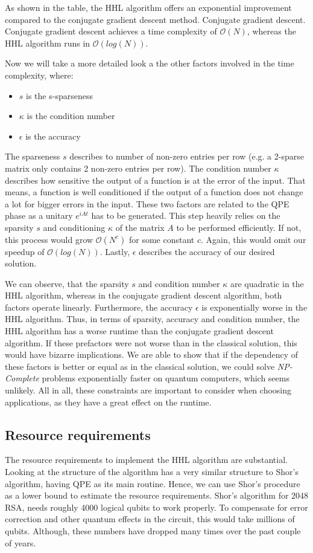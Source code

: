 As shown in the table, the HHL algorithm offers an exponential improvement compared to the conjugate gradient descent method.
Conjugate gradient descent.
Conjugate gradient descent achieves a time complexity of $\mathcal{O}(N)$, whereas the HHL algorithm runs in $\mathcal{O}(log(N))$.

Now we will take a more detailed look a the other factors involved in the time complexity, where:
\begin{itemize}
    \item $s$ is the s-sparseness
    \item $\kappa$ is the condition number
    \item $\epsilon$ is the accuracy
\end{itemize}

The sparseness $s$ describes to number of non-zero entries per row
(e.g. a 2-sparse matrix only contains 2 non-zero entries per row).
The condition number $\kappa$ describes how sensitive the output of a function is at the error of the input.
That means, a function is well conditioned if the output of a function does not change a lot for bigger errors in the input. 
These two factors are related to the QPE phase as a unitary $e^{iAt}$ has to be generated. 
This step heavily relies on the sparsity $s$ and conditioning $\kappa$ of the matrix $A$ to be performed efficiently.
If not, this process would grow $\mathcal{O}(N^c)$ for some constant $c$.
Again, this would omit our speedup of $\mathcal{O}(log(N))$.
Lastly, $\epsilon$ describes the accuracy of our desired solution.

We can observe, that the sparsity $s$ and condition number $\kappa$ are quadratic in the HHL algorithm, whereas in the conjugate gradient descent algorithm, both factors operate linearly.
Furthermore, the accuracy $\epsilon$ is exponentially worse in the HHL algorithm. 
Thus, in terms of sparsity, accuracy and condition number, the HHL algorithm has a worse runtime than the conjugate gradient descent algorithm.
If these prefactors were not worse than in the classical solution, this would have bizarre implications. 
We are able to show that if the dependency of these factors is better or equal as in the classical solution, we could solve \textit{NP-Complete} problems exponentially faster on quantum computers, which seems unlikely.
All in all, these constraints are important to consider when choosing applications, as they have a great effect on the runtime. 


\subsection{Resource requirements}
The resource requirements to implement the HHL algorithm are substantial.
Looking at the structure of the algorithm has a very similar structure to Shor's algorithm, having QPE as its main routine.
Hence, we can use Shor's procedure as a lower bound to estimate the resource requirements.
Shor's algorithm for 2048 RSA, needs roughly 4000 logical qubits to work properly. 
To compensate for error correction and other quantum effects in the circuit, this would take millions of qubits. 
Although, these numbers have dropped many times over the past couple of years.
